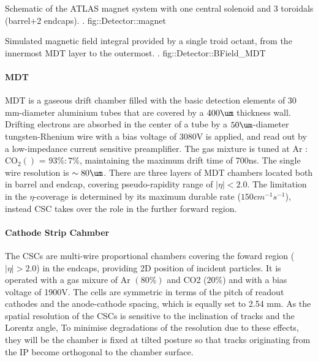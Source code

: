 {Schematic of the ATLAS magnet system with one central solenoid and 3 toroidals (barrel+2 endcaps). \cite{ATLAS_exp}.}
{fig::Detector::magnet}


{ Simulated magnetic field integral provided by a single troid octant, from the innermost MDT layer to the outermost. \cite{ATLAS_exp}.}
{fig::Detector::BField_MDT}





\paragraph{MDT}
MDT is a gaseous drift chamber filled with the basic detection elements of 30 mm-diameter aluminium tubes that are covered by a $400\um$ thickness wall. 
Drifting electrons are absorbed in the center of a tube by a $50\um$-diameter tungsten-Rhenium wire with a bias voltage of 3080V is applied, and read out by a low-impedance current sensitive preamplifier.
The gas mixture is tuned at Ar : $\mathrm{CO_2} ()$ = $93\%:7\%$, maintaining the maximum drift time of 700ns. The single wire resolution is $\sim 80\um$.
There are three layers of MDT chambers located both in barrel and endcap, covering pseudo-rapidity range of $|\eta|<2.0$.
The limitation in the $\eta$-coverage is determined by its maximum durable rate ($150 cm^{-1}s^{-1}$), instead CSC takes over the role in the further forward region.


\paragraph{Cathode Strip Cahmber}
The CSCs are multi-wire proportional chambers covering the foward region ($|\eta|>2.0$) in the endcaps, providing 2D position of incident particles.
It is operated with a gas mixure of Ar $(80\%)$ and CO2 ($20\%$) and with a bias voltage of 1900V.
The cells are symmetric in terms of the pitch of readout cathodes and the anode-cathode spacing, which is equally set to 2.54 mm.
As the spatial resolution of the CSCs is sensitive to the inclination of tracks and the Lorentz angle, To minimise degradations of the resolution due to these effects, they will be the chamber is fixed at tilted posture so that tracks originating from the IP become orthogonal to the chamber surface.


